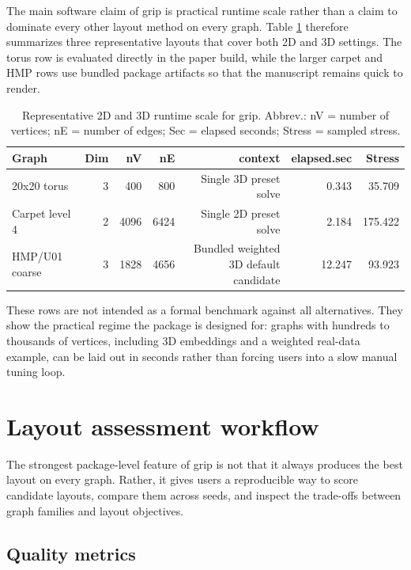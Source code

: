 The main software claim of grip is practical runtime scale rather than a claim
to dominate every other layout method on every graph. Table
\ref{tab:runtime-scale} therefore summarizes three representative layouts that
cover both 2D and 3D settings. The torus row is evaluated directly in the paper
build, while the larger carpet and HMP rows use bundled package artifacts so
that the manuscript remains quick to render.

\begin{table}

\caption{\label{tab:runtime-scale}Representative 2D and 3D runtime scale for grip. Abbrev.: nV = number of vertices; nE = number of edges; Sec = elapsed seconds; Stress = sampled stress.}
\centering
\begin{tabular}[t]{l|r|r|r|r|r|r}
\hline
Graph & Dim & nV & nE & context & elapsed.sec & Stress\\
\hline
20x20 torus & 3 & 400 & 800 & Single 3D preset solve & 0.343 & 35.709\\
\hline
Carpet level 4 & 2 & 4096 & 6424 & Single 2D preset solve & 2.184 & 175.422\\
\hline
HMP/U01 coarse & 3 & 1828 & 4656 & Bundled weighted 3D default candidate & 12.247 & 93.923\\
\hline
\end{tabular}
\end{table}

These rows are not intended as a formal benchmark against all alternatives.
They show the practical regime the package is designed for: graphs with
hundreds to thousands of vertices, including 3D embeddings and a weighted
real-data example, can be laid out in seconds rather than forcing users into a
slow manual tuning loop.

\section{Layout assessment workflow}\label{layout-assessment-workflow}

The strongest package-level feature of grip is not that it always produces the
best layout on every graph. Rather, it gives users a reproducible way to score
candidate layouts, compare them across seeds, and inspect the trade-offs
between graph families and layout objectives.

\subsection{Quality metrics}\label{quality-metrics}

